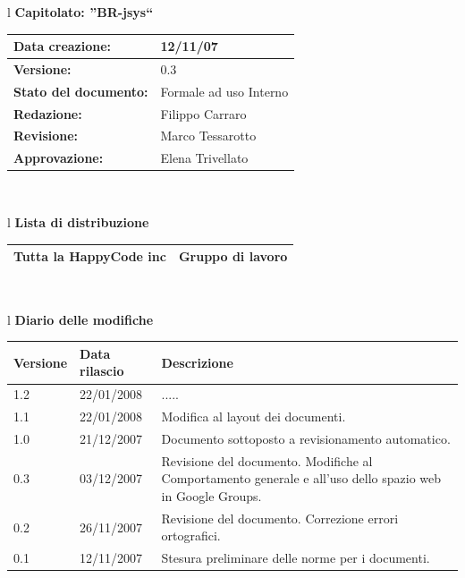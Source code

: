 \documentclass[11pt,titlepage,a4paper]{report}
\begin{document}
\begin{center}
\thispagestyle{plain}
\begin{table}[htbp]
\large{
\begin{tabular}{l}
\Large{\textbf{\textsf{Capitolato: ''BR-jsys``}}} \\
\begin{tabular}{||p{6cm}||p{6cm}||}
\hline
\textbf{Data creazione:} & 12/11/07 \\
\hline
\textbf{Versione:} & 0.3 \\ \hline
\textbf{Stato del documento:} & Formale ad uso Interno \\ \hline
\textbf{Redazione:} & Filippo Carraro \\ \hline
\textbf{Revisione:} & Marco Tessarotto \\ \hline
\textbf{Approvazione:}  & Elena Trivellato\\ \hline
\end{tabular} \\
\end{tabular}
}
\end{table}

\begin{table}[hbtp]
\large{
\begin{tabular}{l}
\Large{\textbf{\textsf{Lista di distribuzione}}} \\
\begin{tabular}{||p{6cm}||p{6cm}||} \hline
{Tutta la HappyCode inc}& Gruppo di lavoro \\ \hline
\end{tabular} \\
\end{tabular}
}
\end{table}

\begin{table}[hbtp]
\large{
\begin{tabular}{l}
\Large{\textbf{\textsf{Diario delle modifiche}}} \\
\begin{tabular}{||p{2cm}||p{3.5cm}||p{6cm}||}
\hline
\textbf{Versione} & \textbf{Data rilascio} & \textbf{Descrizione} \\ \hline
1.2 & 22/01/2008 & .....\\ \hline
1.1 & 22/01/2008 & Modifica al layout dei documenti.\\ \hline
1.0 & 21/12/2007 & Documento sottoposto a revisionamento automatico.\\ \hline
0.3 & 03/12/2007 & Revisione del documento. Modifiche al Comportamento generale e all'uso dello spazio web in Google Groups. \\ \hline
0.2 & 26/11/2007 & Revisione del documento. Correzione errori ortografici. \\ \hline
0.1 & 12/11/2007 & Stesura preliminare delle norme per i documenti. \\ \hline
\end{tabular} \\
\end{tabular}

}
\end{table}
\end{center}
\end{document}
